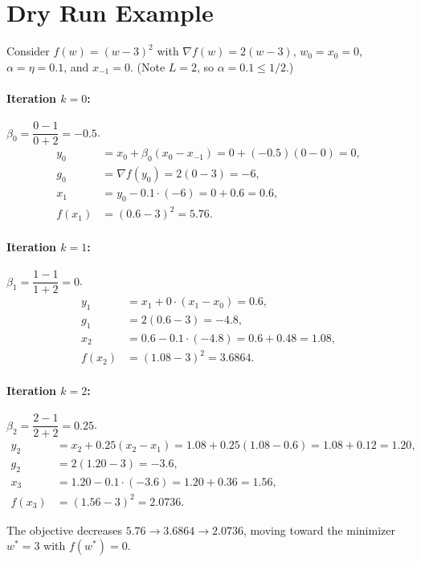 \documentclass{article}
\begin{document}
\section*{Dry Run Example}

Consider $f(w) = (w-3)^2$ with $\nabla f(w) = 2(w-3)$, $w_0 = x_0 = 0$,
$\alpha = \eta = 0.1$, and $x_{-1} = 0$. (Note $L = 2$, so $\alpha = 0.1 \le 1/2$.)

\paragraph{Iteration $k=0$:} $\beta_0 = \dfrac{0-1}{0+2} = -0.5$.
\begin{align*}
y_0 &= x_0 + \beta_0 (x_0 - x_{-1}) = 0 + (-0.5)(0-0) = 0,\\
g_0 &= \nabla f(y_0) = 2(0-3) = -6,\\
x_1 &= y_0 - 0.1 \cdot (-6) = 0 + 0.6 = 0.6,\\
f(x_1) &= (0.6-3)^2 = 5.76.
\end{align*}

\paragraph{Iteration $k=1$:} $\beta_1 = \dfrac{1-1}{1+2} = 0$.
\begin{align*}
y_1 &= x_1 + 0 \cdot (x_1 - x_0) = 0.6,\\
g_1 &= 2(0.6-3) = -4.8,\\
x_2 &= 0.6 - 0.1 \cdot (-4.8) = 0.6 + 0.48 = 1.08,\\
f(x_2) &= (1.08-3)^2 = 3.6864.
\end{align*}

\paragraph{Iteration $k=2$:} $\beta_2 = \dfrac{2-1}{2+2} = 0.25$.
\begin{align*}
y_2 &= x_2 + 0.25 (x_2 - x_1) = 1.08 + 0.25(1.08-0.6) = 1.08 + 0.12 = 1.20,\\
g_2 &= 2(1.20-3) = -3.6,\\
x_3 &= 1.20 - 0.1 \cdot (-3.6) = 1.20 + 0.36 = 1.56,\\
f(x_3) &= (1.56-3)^2 = 2.0736.
\end{align*}

The objective decreases $5.76 \to 3.6864 \to 2.0736$, moving toward the
minimizer $w^* = 3$ with $f(w^*) = 0$.
\end{document}
